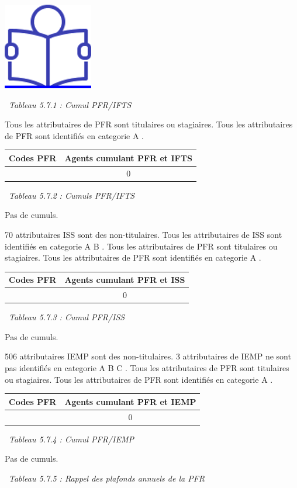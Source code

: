 \href{../Docs/Notices/fiche_PFR.odt}{\includegraphics{icones/Notice.png}}

~\emph{Tableau 5.7.1 : Cumul PFR/IFTS}

Tous les attributaires de PFR sont titulaires ou stagiaires. Tous les
attributaires de PFR sont identifiés en categorie A .

\begin{longtable}[]{@{}cc@{}}
\toprule
Codes PFR & Agents cumulant PFR et IFTS\tabularnewline
\midrule
\endhead
& 0\tabularnewline
\bottomrule
\end{longtable}

~\emph{Tableau 5.7.2 : Cumuls PFR/IFTS}

Pas de cumuls.

70 attributaires ISS sont des non-titulaires. Tous les attributaires de
ISS sont identifiés en categorie A B . Tous les attributaires de PFR
sont titulaires ou stagiaires. Tous les attributaires de PFR sont
identifiés en categorie A .

\begin{longtable}[]{@{}cc@{}}
\toprule
Codes PFR & Agents cumulant PFR et ISS\tabularnewline
\midrule
\endhead
& 0\tabularnewline
\bottomrule
\end{longtable}

~\emph{Tableau 5.7.3 : Cumul PFR/ISS}

Pas de cumuls.

506 attributaires IEMP sont des non-titulaires. 3 attributaires de IEMP
ne sont pas identifiés en categorie A B C . Tous les attributaires de
PFR sont titulaires ou stagiaires. Tous les attributaires de PFR sont
identifiés en categorie A .

\begin{longtable}[]{@{}cc@{}}
\toprule
Codes PFR & Agents cumulant PFR et IEMP\tabularnewline
\midrule
\endhead
& 0\tabularnewline
\bottomrule
\end{longtable}

~\emph{Tableau 5.7.4 : Cumul PFR/IEMP}

Pas de cumuls.

~\emph{Tableau 5.7.5 : Rappel des plafonds annuels de la PFR}

